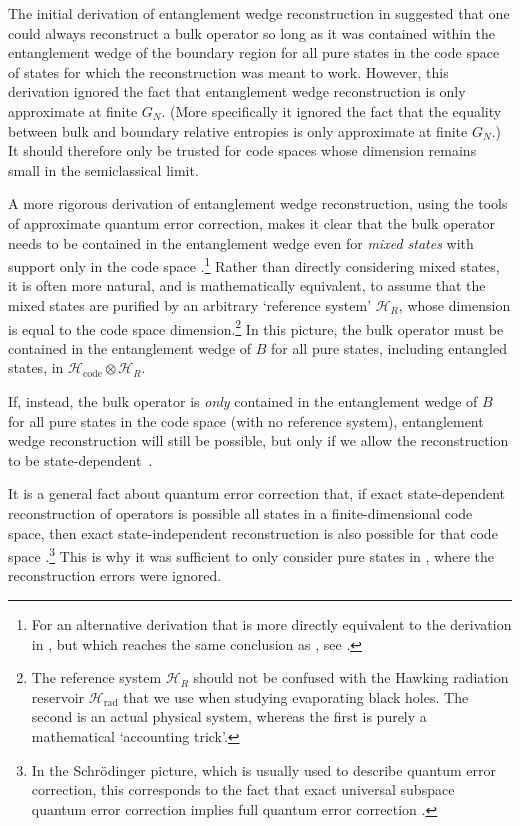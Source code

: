 \documentclass[11pt,a4paper]{article}
\begin{document}
The initial derivation of entanglement wedge reconstruction in \cite{dong2016reconstruction} suggested that one could always reconstruct a bulk operator so long as it was contained within the entanglement wedge of the boundary region for all pure states in the code space of states for which the reconstruction was meant to work. However, this derivation ignored the fact that entanglement wedge reconstruction is only approximate at finite $G_N$. (More specifically it ignored the fact that the equality between bulk and boundary relative entropies \cite{jafferis2016relative} is only approximate at finite $G_N$.) It should therefore only be trusted for code spaces whose dimension remains small in the semiclassical limit.

A more rigorous derivation of entanglement wedge reconstruction, using the tools of approximate quantum error correction, makes it clear that the bulk operator needs to be contained in the entanglement wedge even for \emph{mixed states} with support only in the code space \cite{cotler2017entanglement}.\footnote{For an alternative derivation that is more directly equivalent to the derivation in \cite{dong2016reconstruction}, but which reaches the same conclusion as \cite{cotler2017entanglement}, see \cite{hayden2018learning}.} Rather than directly considering mixed states, it is often more natural, and is mathematically equivalent, to assume that the mixed states are purified by an arbitrary `reference system' $\mathcal{H}_R$, whose dimension is equal to the code space dimension.\footnote{The reference system $\mathcal{H}_R$ should not be confused with the Hawking radiation reservoir $\mathcal{H}_\text{rad}$ that we use when studying evaporating black holes. The second is an actual physical system, whereas the first is purely a mathematical `accounting trick'.} In this picture, the bulk operator must be contained in the entanglement wedge of $B$ for all pure states, including entangled states, in $\mathcal{H}_\text{code} \otimes \mathcal{H}_R$.

If, instead, the bulk operator is \emph{only} contained in the entanglement wedge of $B$ for all pure states in the code space (with no reference system), entanglement wedge reconstruction will still be possible, but only if we allow the reconstruction to be state-dependent~\cite{hayden2018learning}. 

It is a general fact about quantum error correction that, if exact state-dependent reconstruction of operators is possible all states in a finite-dimensional code space, then exact state-independent reconstruction is also possible for that code space \cite{alphabits,hayden2018learning}.\footnote{In the Schr\"{o}dinger picture, which is usually used to describe quantum error correction, this corresponds to the fact that exact universal subspace quantum error correction implies full quantum error correction \cite{alphabits}.} This is why it was sufficient to only consider pure states in \cite{dong2016reconstruction}, where the reconstruction errors were ignored. 
\end{document}
